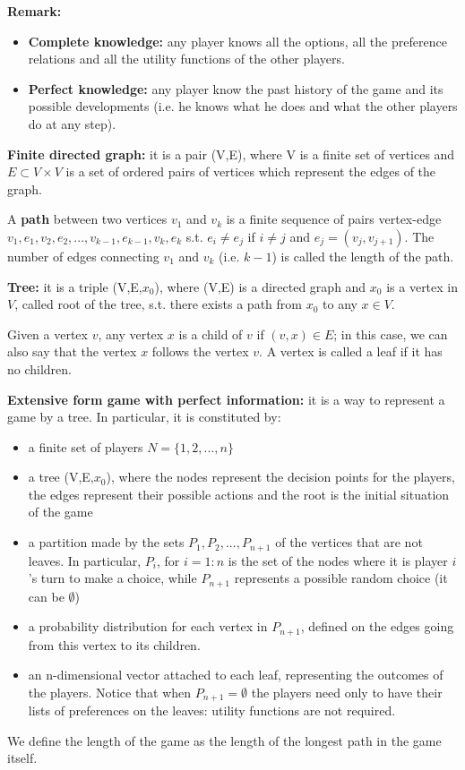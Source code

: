 \documentclass[pt11,a4paper,twoside,reqno,openright]{paper}
\begin{document}
\noindent \textbf{Remark:}
\begin{itemize}
	\item \textbf{Complete knowledge:} any player knows all the options, all the 
	preference relations and all the utility functions of the other players.
	\item \textbf{Perfect knowledge:} any player know the past history of the 
	game and its possible developments (i.e. he knows what he does and what the 
	other players do at any step).
\end{itemize}

\noindent \textbf{Finite directed graph:} it is a pair (V,E), where V is a 
finite set of vertices and $E \subset V \times V$ is a set of ordered pairs of 
vertices which represent the edges of the graph.

\noindent A \textbf{path} between two vertices $v_1$ and $v_k$ is a finite 
sequence of pairs vertex-edge $v_1,e_1,v_2,e_2,...,v_{k-1},e_{k-1},v_k,e_k$ 
s.t. $e_i \neq e_j$ if $i \neq j$ and $e_j = (v_j,v_{j+1})$. The number of 
edges connecting $v_1$ and $v_k$ (i.e. $k-1$) is called the length of the path.

\noindent \textbf{Tree:} it is a triple (V,E,$x_0$), where (V,E) is a directed 
graph and $x_0$ is a vertex in $V$, called root of the tree, s.t. there exists 
a path from $x_0$ to any $x \in V$.

\noindent Given a vertex $v$, any vertex $x$ is a child of $v$ if $(v,x) \in E$; 
in this case, we can also say that the vertex $x$ follows the vertex $v$. 
A vertex is called a leaf if it has no children.

\bigskip
\noindent \textbf{Extensive form game with perfect information:} it is a way to 
represent a game by a tree. In particular, it is constituted by:
\begin{itemize}
	\item a finite set of players $N = \{1,2,...,n\}$
	\item a tree (V,E,$x_0$), where the nodes represent the decision points for 
	the players, the edges represent their possible actions and the root is the 
	initial situation of the game
	\item a partition made by the sets $P_1,P_2,...,P_{n+1}$ of the vertices 
	that are not leaves. In particular, $P_i$, for $i=1:n$ is the set of the 
	nodes where it is player $i$'s turn to make a choice, while $P_{n+1}$ 
	represents a possible random choice (it can be $\emptyset$)
	\item a probability distribution for each vertex in $P_{n+1}$, defined on 
	the edges going from this vertex to its children.
	\item an n-dimensional vector attached to each leaf, representing the 
	outcomes of the players. Notice that when $P_{n+1}=\emptyset$ the players 
	need only to have their lists of preferences on the leaves: utility 
	functions are not required.
\end{itemize}
We define the length of the game as the length of the longest path in the game 
itself.
\end{document}
